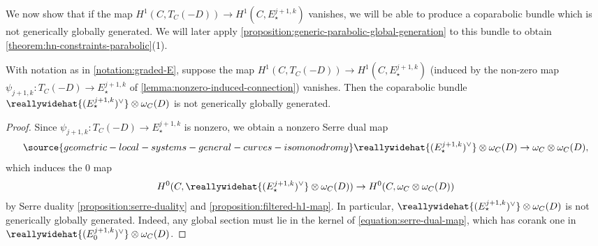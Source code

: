 We now show that if the map $H^1(C, T_C(-D)) \to H^1(C, E_\star^{j+1,k})$
vanishes, we will be able to produce a coparabolic  bundle which is not generically
globally generated.
We will later apply \autoref{proposition:generic-parabolic-global-generation}
to this bundle
to obtain \autoref{theorem:hn-constraints-parabolic}(1).

\begin{lemma}
\notready
	\label{lemma:not-generically-globally-generated}
	With notation as in \autoref{notation:graded-E},
	suppose the map
	$H^1(C, T_C(-D)) \to
	H^1(C, E_\star^{j+1,k})$ (induced by the non-zero map $\psi_{j+1, k}: T_C(-D)\to E_\star^{j+1,k}$ of \autoref{lemma:nonzero-induced-connection}) vanishes.
Then the coparabolic bundle $\reallywidehat{(E_\star^{j+1,k})^\vee} \otimes \omega_C(D)$ is not generically globally
	generated.
\end{lemma}
\begin{proof}
	Since
	$\psi_{j+1, k}: T_C(-D) \to E_\star^{j+1,k}$ is nonzero,
we obtain a nonzero Serre dual map
\begin{align}
	\label{equation:serre-dual-map}
\source{geometric-local-systems-general-curves-isomonodromy}
	\reallywidehat{(E_\star^{j+1,k})^\vee}
	\otimes \omega_C(D) \to \omega_C \otimes \omega_C(D),
\end{align}
which induces the $0$ map
\begin{align*}
	H^0(C,\reallywidehat{(E_\star^{j+1,k})^\vee} \otimes \omega_C(D) )
	\to H^0(C, \omega_C\otimes \omega_C(D))
\end{align*}
by Serre duality \autoref{proposition:serre-duality} and
\autoref{proposition:filtered-h1-map}.
In particular,
$\reallywidehat{(E_\star^{j+1,k})^\vee} \otimes \omega_C(D)$ is not
generically globally generated. Indeed, any global section must lie in the kernel
of \eqref{equation:serre-dual-map}, which has corank one in
$\reallywidehat{(E_0^{j+1,k})^\vee} \otimes \omega_C(D)$.
\end{proof}

